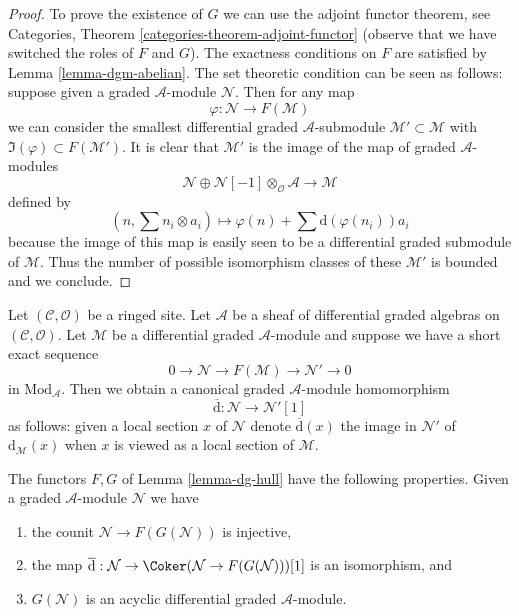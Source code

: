 \begin{proof}
To prove the existence of $G$ we can use the adjoint functor theorem, see
Categories, Theorem \ref{categories-theorem-adjoint-functor} (observe that
we have switched the roles of $F$ and $G$). The exactness conditions on
$F$ are satisfied by Lemma \ref{lemma-dgm-abelian}. The set theoretic
condition can be seen as follows: suppose given a graded $\mathcal{A}$-module
$\mathcal{N}$. Then for any map
$$
\varphi : \mathcal{N} \longrightarrow F(\mathcal{M})
$$
we can consider the smallest differential graded $\mathcal{A}$-submodule
$\mathcal{M}' \subset \mathcal{M}$ with
$\Im(\varphi) \subset F(\mathcal{M}')$.
It is clear that $\mathcal{M}'$ is the image of the map
of graded $\mathcal{A}$-modules
$$
\mathcal{N} \oplus
\mathcal{N}[-1] \otimes_\mathcal{O} \mathcal{A}
\longrightarrow
\mathcal{M}
$$
defined by
$$
(n, \sum n_i \otimes a_i) \longmapsto
\varphi(n) + \sum \text{d}(\varphi(n_i)) a_i
$$
because the image of this map is easily seen to be a differential graded
submodule of $\mathcal{M}$.
Thus the number of possible isomorphism classes of these $\mathcal{M}'$
is bounded and we conclude.
\end{proof}

\noindent
Let $(\mathcal{C}, \mathcal{O})$ be a ringed site.
Let $\mathcal{A}$ be a sheaf of differential graded algebras
on $(\mathcal{C}, \mathcal{O})$. Let $\mathcal{M}$ be a differential
graded $\mathcal{A}$-module and suppose we have a short exact sequence
$$
0 \to \mathcal{N} \to F(\mathcal{M}) \to \mathcal{N}' \to 0
$$
in $\text{Mod}_\mathcal{A}$. Then we obtain a canonical
graded $\mathcal{A}$-module homomorphism
$$
\overline{\text{d}} : \mathcal{N} \to \mathcal{N}'[1]
$$
as follows: given a local section $x$ of $\mathcal{N}$ denote
$\overline{\text{d}}(x)$ the image in $\mathcal{N}'$ of
$\text{d}_\mathcal{M}(x)$ when $x$ is viewed as a local section
of $\mathcal{M}$.

\begin{lemma}
\label{lemma-dg-hull-acyclic}
The functors $F, G$ of Lemma \ref{lemma-dg-hull} have
the following properties. Given a graded $\mathcal{A}$-module
$\mathcal{N}$ we have
\begin{enumerate}
\item the counit $\mathcal{N} \to F(G(\mathcal{N}))$ is injective,
\item the map $\overline{\text{d}} : \mathcal{N} \to
\Coker(\mathcal{N} \to F(G(\mathcal{N})))[1]$ is an isomorphism, and
\item $G(\mathcal{N})$ is an acyclic differential graded $\mathcal{A}$-module.
\end{enumerate}
\end{lemma}

